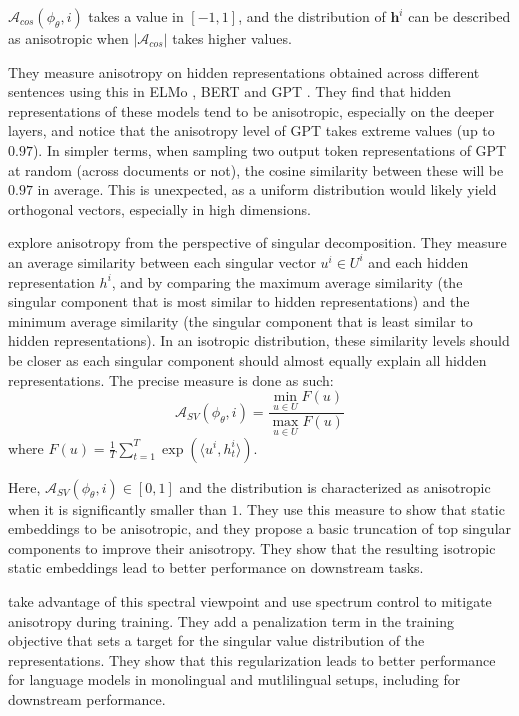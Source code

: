 $\mathcal{A}_{cos}(\phi_\theta, i)$ takes a value in $[-1, 1]$, and the distribution of $\mathbf{h}^i$ can be described as anisotropic when $|\mathcal{A}_{cos}|$ takes higher values.

They measure anisotropy on hidden representations obtained across different sentences using this in ELMo \citep{peters-etal-2018-deep}, BERT \citep{devlin-etal-2019-bert} and GPT \citep{Radford2018ImprovingLU}. They find that hidden representations of these models tend to be anisotropic, especially on the deeper layers, and notice that the anisotropy level of GPT takes extreme values (up to $0.97$). In simpler terms, when sampling two output token representations of GPT at random (across documents or not), the cosine similarity between these will be $0.97$ in average. This is unexpected, as a uniform distribution would likely yield orthogonal vectors, especially in high dimensions.

\citet{mu2018allbutthetop} explore anisotropy from the perspective of singular decomposition. They measure an average similarity between each singular vector $u^i \in U^i$ and each hidden representation $h^i$, and by comparing the maximum average similarity (the singular component that is most similar to hidden representations) and the minimum average similarity (the singular component that is least similar to hidden representations). In an isotropic distribution, these similarity levels should be closer as each singular component should almost equally explain all hidden representations. The precise measure is done as such:
$$
\mathcal{A}_{SV}(\phi_\theta, i) = \frac{\min_{u \in U} F(u)}{\max_{u \in U} F(u)}
$$
where $F(u) = \frac{1}{T} \sum_{t=1}^{T} \exp (\langle u^i, h^i_t\rangle)$.

Here, $\mathcal{A}_{SV}(\phi_\theta, i) \in [0, 1]$ and the distribution is characterized as anisotropic when it is significantly smaller than $1$. They use this measure to show that static embeddings to be anisotropic, and they propose a basic truncation of top singular components to improve their anisotropy. They show that the resulting isotropic static embeddings lead to better performance on downstream tasks.

\citet{Wang2020Improving} take advantage of this spectral viewpoint and use spectrum control to mitigate anisotropy during training. They add a penalization term in the training objective that sets a target for the singular value distribution of the representations. They show that this regularization leads to better performance for language models in monolingual and mutlilingual setups, including for downstream performance.

